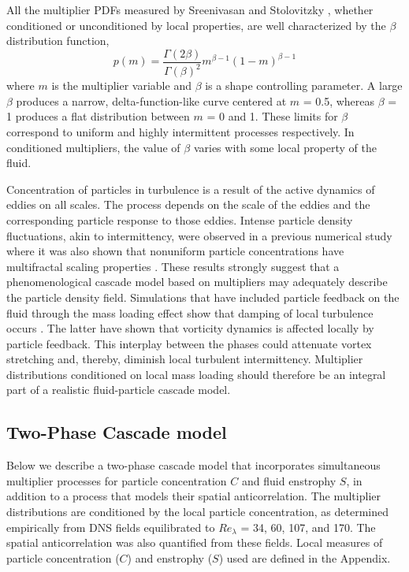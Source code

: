 \documentclass[aps,pra,twocolumn,groupedaddress,showkeys,showpacs,floatfix]{revtex4}
\begin{document}
All the multiplier PDFs measured by Sreenivasan and Stolovitzky \cite{Sreenivasan:1}, whether 
conditioned or unconditioned by local properties, are well characterized by the
$\beta$ distribution function,
\begin{equation}
   \label{beta} p(m) = \frac{\Gamma(2\beta)}{\Gamma(\beta)^2} m^{\beta-1}(1-m)^{\beta-1} 
\end{equation}
where $m$ is the multiplier variable and $\beta$ is a shape controlling
parameter. A large $\beta$ produces a narrow, delta-function-like curve
centered at $m$ = 0.5, whereas $\beta$ = 1 produces a flat distribution between
 $m$ = 0 and 1. These limits for $\beta$ correspond to uniform and highly
intermittent processes respectively. In conditioned multipliers, the value
of $\beta$ varies with some local property of the fluid.
 
Concentration of particles in turbulence is a result of  the active dynamics of
eddies on all scales. The  process depends on the scale of the eddies and the
corresponding  particle response to those eddies. Intense particle density
fluctuations,  akin to intermittency, were observed in a previous numerical
study  where it was also shown that nonuniform particle concentrations have
multifractal scaling properties \cite{Hogan:1}. These results strongly
suggest that a phenomenological cascade model based on multipliers may
adequately describe the particle density field. Simulations that have  included
particle feedback on the fluid through the mass loading  effect show that
damping of local turbulence occurs \cite{Squires:1,Elghobashi:2}. 
The latter have shown that vorticity dynamics is affected 
locally by particle feedback. This interplay between the phases could attenuate 
vortex stretching and, thereby, diminish local turbulent intermittency. 
Multiplier distributions conditioned on local mass loading should therefore be an 
integral part of a realistic fluid-particle cascade model.

\subsection { Two-Phase Cascade model }

 Below we describe a two-phase cascade model that incorporates  simultaneous
multiplier processes for particle concentration $C$ and fluid enstrophy $S$, in
addition to a process that models their spatial anticorrelation.  The
multiplier distributions are conditioned by the local particle concentration,
as determined empirically from DNS fields  equilibrated to  $Re_\lambda$ = 34,
60, 107, and 170. The spatial  anticorrelation was also quantified from these
fields. Local measures of particle concentration ($C$) and enstrophy ($S$) used
are defined in the Appendix.
\end{document}
